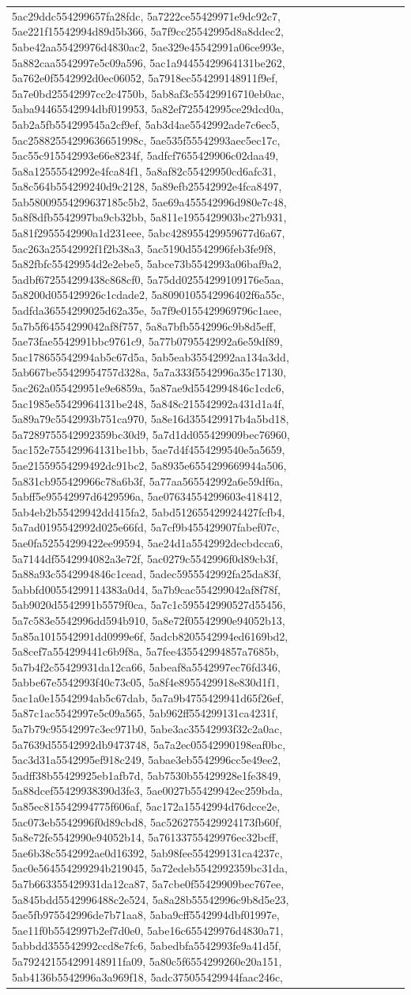 \documentclass{article} %
\begin{document}
\begin{table}[h!]
\begin{tabular}{|p{12cm}|}
5ac29ddc554299657fa28fdc, 5a7222ce55429971e9dc92c7, 5ae221f15542994d89d5b366, 5a7f9cc25542995d8a8ddec2, 5abe42aa55429976d4830ac2, 5ae329e45542991a06ce993e, 5a882caa5542997e5c09a596, 5ac1a94455429964131be262, 5a762e0f5542992d0ec06052, 5a7918ec554299148911f9ef, 5a7e0bd25542997cc2c4750b, 5ab8af3c55429916710eb0ac, 5aba94465542994dbf019953, 5a82ef725542995ce29dcd0a, 5ab2a5fb554299545a2cf9ef, 5ab3d4ae5542992ade7c6ec5, 5ac25882554299636651998c, 5ae535f55542993aec5ec17c, 5ac55c915542993e66e8234f, 5adfcf7655429906c02daa49, 5a8a12555542992e4fca84f1, 5a8af82c55429950cd6afc31, 5a8c564b554299240d9c2128, 5a89efb25542992e4fca8497, 5ab58009554299637185c5b2, 5ae69a455542996d980e7c48, 5a8f8dfb5542997ba9cb32bb, 5a811e1955429903bc27b931, 5a81f2955542990a1d231eee, 5abc428955429959677d6a67, 5ac263a25542992f1f2b38a3, 5ac5190d5542996feb3fe9f8, 5a82fbfc55429954d2e2ebe5, 5abce73b5542993a06baf9a2, 5adbf672554299438c868cf0, 5a75dd02554299109176e5aa, 5a8200d055429926c1cdade2, 5a8090105542996402f6a55c, 5adfda36554299025d62a35e, 5a7f9e0155429969796c1aee, 5a7b5f64554299042af8f757, 5a8a7bfb5542996c9b8d5eff, 5ae73fae5542991bbc9761c9, 5a77b0795542992a6e59df89, 5ac178655542994ab5c67d5a, 5ab5eab35542992aa134a3dd, 5ab667be55429954757d328a, 5a7a333f5542996a35c17130, 5ac262a055429951e9e6859a, 5a87ae9d5542994846c1cdc6, 5ac1985e55429964131be248, 5a848c215542992a431d1a4f, 5a89a79c5542993b751ca970, 5a8e16d355429917b4a5bd18, 5a7289755542992359bc30d9, 5a7d1dd055429909bec76960, 5ac152e755429964131be1bb, 5ae7d4f4554299540e5a5659, 5ae21559554299492dc91bc2, 5a8935e6554299669944a506, 5a831cb955429966c78a6b3f, 5a77aa565542992a6e59df6a, 5abff5e95542997d6429596a, 5ae07634554299603e418412, 5ab4eb2b55429942dd415fa2, 5abd512655429924427fcfb4, 5a7ad0195542992d025e66fd, 5a7cf9b455429907fabef07c, 5ae0fa52554299422ee99594, 5ae24d1a5542992decbdcca6, 5a7144df5542994082a3e72f, 5ac0279c5542996f0d89cb3f, 5a88a93c5542994846c1cead, 5adec5955542992fa25da83f, 5abbfd00554299114383a0d4, 5a7b9cac554299042af8f78f, 5ab9020d5542991b5579f0ca, 5a7c1c595542990527d55456, 5a7c583e5542996dd594b910, 5a8e72f05542990e94052b13, 5a85a1015542991dd0999e6f, 5adcb8205542994ed6169bd2, 5a8cef7a554299441c6b9f8a, 5a7fee435542994857a7685b, 5a7b4f2c55429931da12ca66, 5abeaf8a5542997ec76fd346, 5abbe67e5542993f40c73c05, 5a8f4e8955429918e830d1f1, 5ac1a0e15542994ab5c67dab, 5a7a9b4755429941d65f26ef, 5a87c1ac5542997e5c09a565, 5ab962ff554299131ca4231f, 5a7b79c95542997c3ec971b0, 5abe3ac35542993f32c2a0ac, 5a7639d55542992db9473748, 5a7a2ec05542990198eaf0bc, 5ac3d31a5542995ef918c249, 5abae3eb5542996cc5e49ee2, 5adff38b55429925eb1afb7d, 5ab7530b55429928e1fe3849, 5a88dcef55429938390d3fe3, 5ae0027b55429942ec259bda, 5a85ec815542994775f606af, 5ac172a15542994d76dcce2e, 5ac073eb5542996f0d89cbd8, 5ac5262755429924173fb60f, 5a8e72fe5542990e94052b14, 5a76133755429976ec32bcff, 5ae6b38c5542992ae0d16392, 5ab98fee554299131ca4237c, 5ac0e564554299294b219045, 5a72edeb5542992359bc31da, 5a7b663355429931da12ca87, 5a7cbe0f55429909bec767ee, 5a845bdd5542996488c2e524, 5a8a28b55542996c9b8d5e23, 5ae5fb975542996de7b71aa8, 5aba9cff5542994dbf01997e, 5ae11f0b5542997b2ef7d0e0, 5abe16c655429976d4830a71, 5abbdd355542992ccd8e7fc6, 5abedbfa5542993fe9a41d5f, 5a792421554299148911fa09, 5a80c5f6554299260e20a151, 5ab4136b5542996a3a969f18, 5adc375055429944faac246c, 
\end{tabular}
\end{table}
\end{document}

